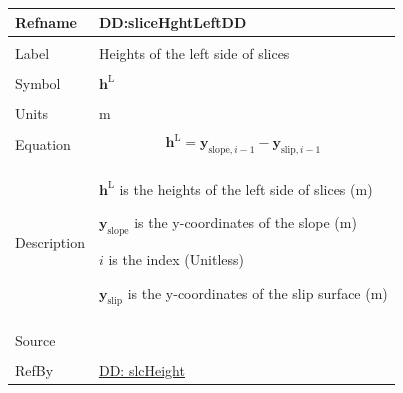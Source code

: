 \documentclass[12pt]{article}
\begin{document}
\noindent \begin{minipage}{\textwidth}
\begin{tabular}{>{\raggedright}p{}>{\raggedright\arraybackslash}p{}}
\toprule \textbf{Refname} & \textbf{DD:sliceHghtLeftDD}
\label{DD:sliceHghtLeftDD}
\\ \midrule \\
Label & Heights of the left side of slices
\\ \midrule \\
Symbol & ${\mathbf{h}^{\text{L}}}$
\\ \midrule \\
Units & m
\\ \midrule \\
Equation & \begin{displaymath}
           {\mathbf{h}^{\text{L}}}={\mathbf{y}_{\text{slope},i-1}}-{\mathbf{y}_{\text{slip},i-1}}
           \end{displaymath}
\\ \midrule \\
Description & \begin{symbDescription}
              \item{${\mathbf{h}^{\text{L}}}$ is the heights of the left side of slices (m)}
              \item{${\mathbf{y}_{\text{slope}}}$ is the y-coordinates of the slope (m)}
              \item{$i$ is the index (Unitless)}
              \item{${\mathbf{y}_{\text{slip}}}$ is the y-coordinates of the slip surface (m)}
              \end{symbDescription}
\\ \midrule \\
Source & \cite{fredlund1977}
\\ \midrule \\
RefBy & \hyperref[DD:slcHeight]{DD: slcHeight}
\\ \bottomrule
\end{tabular}
\end{minipage}
\end{document}
